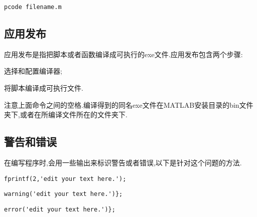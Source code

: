   \vspace{-0.8cm}
  \begin{lstlisting}[caption = 代码保护]
    pcode filename.m
  \end{lstlisting}




\subsection{应用发布}
 应用发布是指把脚本或者函数编译成可执行的exe文件.应用发布包含两个步骤:

 \begindot
  \item {} 选择和配置编译器;
  \item {} 将脚本编译成可执行文件.
 \myenddot

注意上面命令之间的空格.编译得到的同名exe文件在MATLAB安装目录的bin文件夹下,或者在所编译文件所在的文件夹下.

\subsection{警告和错误}
在编写程序时,会用一些输出来标识警告或者错误,以下是针对这个问题的方法.

\vspace{-0.8cm}
\begin{lstlisting}[caption = 红色字符串输出]
  fprintf(2,'edit your text here.');
\end{lstlisting}


\vspace{-0.8cm}
\begin{lstlisting}[caption = 警告输出]
  warning('edit your text here.')};
\end{lstlisting}

\vspace{-0.8cm}
\begin{lstlisting}[caption = 错误输出]
  error('edit your text here.')};
\end{lstlisting}


